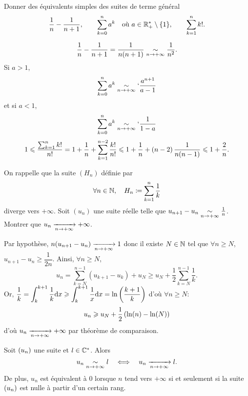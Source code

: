 \documentclass{magnoliaold}
\begin{document}
\begin{exos}
\exo Donner des équivalents simples des suites de terme général
  \[\frac{1}{n}-\frac{1}{n+1}, \qquad \sum_{k=0}^n a^k
    \quad\text{où $a\in\mathbb{R}_+^*\setminus\left\{1\right\}$}, \qquad \sum_{k=1}^n k!.\]
    \begin{sol}
    $$\frac{1}{n}-\frac{1}{n+1}=\frac{1}{n(n+1)}\underset{n\rightarrow +\infty}{\sim}\frac{1}{n^2}.$$
    Si $a>1$, $$\sum_{k=0}^n a^k\underset{n\rightarrow +\infty}{\sim}`\frac{a^{n+1}}{a-1}$$ et si $a<1$, $$\sum_{k=0}^n a^k\underset{n\rightarrow +\infty}{\sim}`\frac{1}{1-a}$$
    $$1\leqslant \frac{\sum_{k=1}^n k!}{n!}=1+\frac{1}{n}+\sum_{k=1}^{n-2}\frac{k!}{n!}\leqslant 1+\frac{1}{n}+\left(n-2\right)\frac{1}{n(n-1)}\leqslant 1+\frac{2}{n}.$$
    
    
    \end{sol}
\exo On rappelle que la suite $(H_n)$ définie par
  \[\forall n\in\mathbb{N},\quad H_n\coloneqq \sum_{k=1}^n \frac{1}{k}\]
  diverge vers $+\infty$. Soit $(u_n)$ une suite réelle telle que
  $u_{n+1}-u_n \underset{n\rightarrow +\infty}{\sim} \frac{1}{n}$.
  Montrer que $u_n\xrightarrow[n\rightarrow +\infty]{}+\infty$.
  \begin{sol}
  Par hypothèse, $n(u_{n+1}-u_n) \xrightarrow[n\rightarrow +\infty]{}{1}$ donc il existe $N\in \mathbb{N}$ tel que $\forall n \geq N$, $u_{n+1}-u_n \geq \dfrac{1}{2n}$. Ainsi,
  $\forall n \geq N$, $$u_n=\sum_{k=N}^{n-1} (u_{k+1}-u_k) + u_N \geq u_N + \frac{1}{2}\sum_{k=N}^{n-1}\frac{1}{k}.$$
  Or, $\displaystyle \frac{1}{k}=\int_{k}^{k+1}\frac{1}{k}\mathrm{d}x\geqslant \displaystyle \int_{k}^{k+1}\frac{1}{x}\mathrm{d}x=\ln\left(\frac{k+1}{k}\right)$ d'où $\forall n \geq N$: $$u_n \geqslant u_N + \frac{1}{2}\left(\ln(n)-\ln(N)\right)$$ d'où $u_n\xrightarrow[n\rightarrow +\infty]{}+\infty$ par théorème de comparaison.
  \end{sol}
\end{exos}


\begin{proposition}[utile=-3]
Soit $\left(u_n\right)$ une suite et $l\in\mathbb{C}^*$. Alors
\[u_n \underset{n\rightarrow +\infty}{\sim} l \quad\Longleftrightarrow\quad u_n \xrightarrow[n\rightarrow +\infty]{} l.\]
De plus, $u_n$ est équivalent à 0 lorsque $n$ tend vers $+\infty$ si et
seulement si la suite $\left(u_n\right)$ est nulle à partir d'un certain rang.
\end{proposition}
\end{document}
